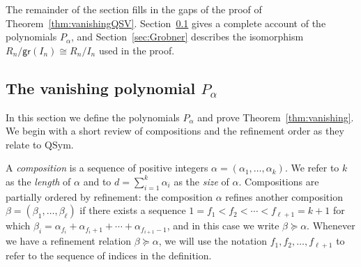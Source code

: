 \documentclass[12pt]{amsart}
\theoremstyle{definition}
\theoremstyle{remark}
\newtheorem{rem}[equation]{Remark}
\numberwithin{equation}{section}
\newcommand{\QSym}{\mathrm{QSym}}
\newcommand{\QSV}{\mathrm{QSV}}
\begin{document}

The remainder of the section fills in the gaps of the proof of Theorem~\ref{thm:vanishingQSV}.  Section~\ref{sec:QSymvanish} gives a complete account of the polynomials $P_{\alpha}$, and Section~\ref{sec:Grobner} describes the isomorphism $R_{n}/\mathsf{gr}(I_{n}) \cong R_{n}/I_{n}$ used in the proof.


\subsection{The vanishing polynomial $P_{\alpha}$}
\label{sec:QSymvanish}

In this section we define the polynomials $P_{\alpha}$ and prove Theorem~\ref{thm:vanishing}.  We begin with a short review of compositions and the refinement order as they relate to $\QSym$.  

A \emph{composition} is a sequence of positive integers $\alpha = (\alpha_{1}, \ldots, \alpha_{k})$.  We refer to $k$ as the \emph{length} of $\alpha$ and to $d = \sum_{i = 1}^{k} \alpha_{i}$ as the \emph{size} of $\alpha$.  Compositions are partially ordered by refinement: the composition $\alpha$ refines another composition $\beta = (\beta_{1}, \ldots, \beta_{\ell})$ if there exists a sequence $1 = f_{1} < f_{2} < \cdots < f_{\ell + 1} = k+1$ for which $\beta_{i} = \alpha_{f_{i}} + \alpha_{f_{i} + 1} + \cdots + \alpha_{f_{i+1} - 1}$, and in this case we write $\beta \succeq \alpha$.  Whenever we have a refinement relation $\beta \succeq \alpha$, we will use the notation $f_{1}, f_{2}, \ldots, f_{\ell+1}$ to refer to the sequence of indices in the definition.
\end{document}
